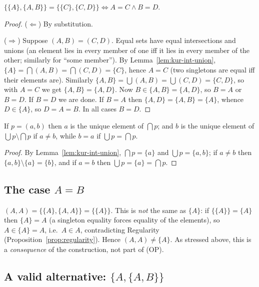 \begin{theorem}\label{thm:kuratowski}
	$\{\{A\},\{A,B\}\}=\{\{C\},\{C,D\}\}\iff A=C\wedge B=D$.
\end{theorem}
\begin{proof}
	($\Leftarrow$) By substitution.
	
	($\Rightarrow$) Suppose $(A,B)=(C,D)$. Equal sets have equal intersections and unions (an element lies in every member of one iff it lies in every member of the other; similarly for ``some member''). By Lemma~\ref{lem:kur-int-union}, $\{A\}=\bigcap(A,B)=\bigcap(C,D)=\{C\}$, hence $A=C$ (two singletons are equal iff their elements are). Similarly $\{A,B\}=\bigcup(A,B)=\bigcup(C,D)=\{C,D\}$, so with $A=C$ we get $\{A,B\}=\{A,D\}$. Now $B\in\{A,B\}=\{A,D\}$, so $B=A$ or $B=D$. If $B=D$ we are done. If $B=A$ then $\{A,D\}=\{A,B\}=\{A\}$, whence $D\in\{A\}$, so $D=A=B$. In all cases $B=D$.
\end{proof}

\begin{corollary}
	If $p=(a,b)$ then $a$ is the unique element of $\bigcap p$; and $b$ is the unique element of $\bigcup p\setminus\bigcap p$ if $a\ne b$, while $b=a$ if $\bigcup p=\bigcap p$.
\end{corollary}
\begin{proof}
	By Lemma~\ref{lem:kur-int-union}, $\bigcap p=\{a\}$ and $\bigcup p=\{a,b\}$; if $a\ne b$ then $\{a,b\}\setminus\{a\}=\{b\}$, and if $a=b$ then $\bigcup p=\{a\}=\bigcap p$.
\end{proof}

\subsection{The case $A=B$}

$(A,A)=\{\{A\},\{A,A\}\}=\{\{A\}\}$. This is \emph{not} the same as $\{A\}$: if $\{\{A\}\}=\{A\}$ then $\{A\}=A$ (a singleton equality forces equality of the elements), so $A\in\{A\}=A$, i.e.\ $A\in A$, contradicting Regularity (Proposition~\ref{prop:regularity}). Hence $(A,A)\ne\{A\}$. As stressed above, this is a \emph{consequence} of the construction, not part of (OP).

\subsection{A valid alternative: $\{A,\{A,B\}\}$}

